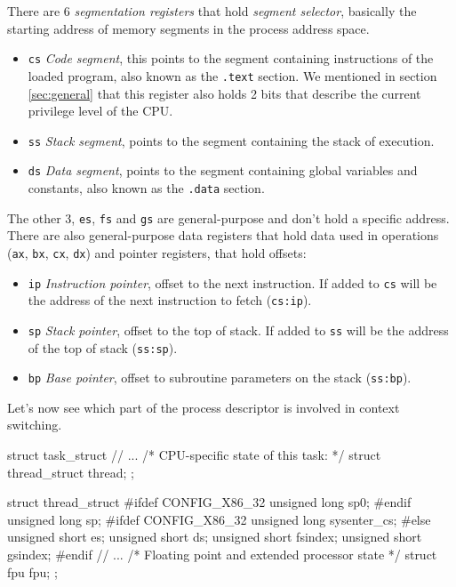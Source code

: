 There are 6 \textit{segmentation registers} that hold \textit{segment selector}, basically the starting address of memory segments in the process address space.
\begin{itemize}
    \item \verb|cs| \textit{Code segment}, this points to the segment containing instructions of the loaded program, also known as the \verb|.text| section. We mentioned in section \ref{sec:general} that this register also holds 2 bits that describe the current privilege level of the CPU.
    \item \verb|ss| \textit{Stack segment}, points to the segment containing the stack of execution.
    \item \verb|ds| \textit{Data segment}, points to the segment containing global variables and constants, also known as the \verb|.data| section.
\end{itemize}
The other 3, \verb|es|, \verb|fs| and \verb|gs| are general-purpose and don't hold a specific address. There are also general-purpose data registers that hold data used in operations (\verb|ax|, \verb|bx|, \verb|cx|, \verb|dx|) and pointer registers, that hold offsets:
\begin{itemize}
    \item \verb|ip| \textit{Instruction pointer}, offset to the next instruction. If added to \verb|cs| will be the address of the next instruction to fetch (\verb|cs:ip|).
    \item \verb|sp| \textit{Stack pointer}, offset to the top of stack. If added to \verb|ss| will be the address of the top of stack (\verb|ss:sp|).
    \item \verb|bp| \textit{Base pointer}, offset to subroutine parameters on the stack (\verb|ss:bp|).
\end{itemize}
Let's now see which part of the process descriptor is involved in context switching.
\begin{code}
struct task_struct {
    // ...
    /* CPU-specific state of this task: */
    struct thread_struct    thread;
};
\end{code}
\begin{code}
struct thread_struct {
#ifdef CONFIG_X86_32
    unsigned long	sp0;
#endif
    unsigned long	sp;
#ifdef CONFIG_X86_32
    unsigned long	sysenter_cs;
#else
    unsigned short	es;
    unsigned short	ds;
    unsigned short	fsindex;
    unsigned short        gsindex;
#endif
    // ...
    /* Floating point and extended processor state */
    struct fpu      fpu;
};
\end{code}
